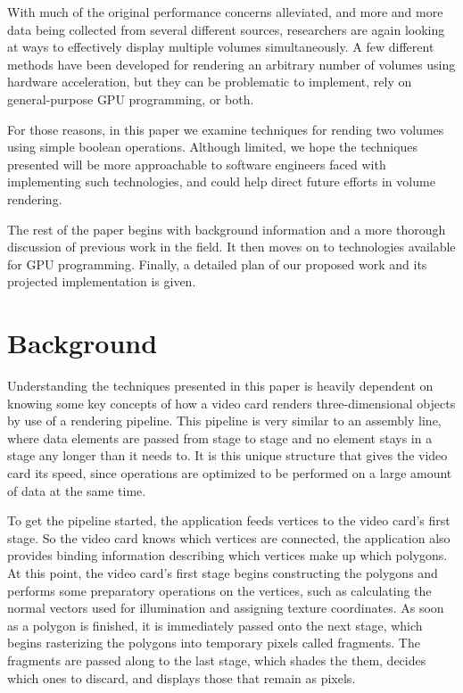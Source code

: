 \documentclass{article}
\begin{document}
With much of the original performance concerns alleviated, and more and more
data being collected from several different sources, researchers are again
looking at ways to effectively display multiple volumes simultaneously.  A few
different methods have been developed for rendering an arbitrary number of
volumes using hardware acceleration, but they can be problematic to implement,
rely on general-purpose GPU programming, or both.

For those reasons, in this paper we examine techniques for rending two volumes
using simple boolean operations.  Although limited, we hope the techniques
presented will be more approachable to software engineers faced with
implementing such technologies, and could help direct future efforts in volume
rendering.

The rest of the paper begins with background information and a more thorough
discussion of previous work in the field.  It then moves on to technologies
available for GPU programming.  Finally, a detailed plan of our proposed work
and its projected implementation is given.

\section{Background}

Understanding the techniques presented in this paper is heavily dependent on
knowing some key concepts of how a video card renders three-dimensional objects
by use of a rendering pipeline.  This pipeline is very similar to an assembly
line, where data elements are passed from stage to stage and no element stays in
a stage any longer than it needs to.  It is this unique structure that gives the
video card its speed, since operations are optimized to be performed on a large
amount of data at the same time.

To get the pipeline started, the application feeds vertices to the video card’s
first stage.  So the video card knows which vertices are connected, the
application also provides binding information describing which vertices make up
which polygons.  At this point, the video card’s first stage begins constructing
the polygons and performs some preparatory operations on the vertices, such as
calculating the normal vectors used for illumination and assigning texture
coordinates.  As soon as a polygon is finished, it is immediately passed onto
the next stage, which begins rasterizing the polygons into temporary pixels
called fragments.  The fragments are passed along to the last stage, which
shades the them, decides which ones to discard, and displays those that remain
as pixels.
\end{document}
